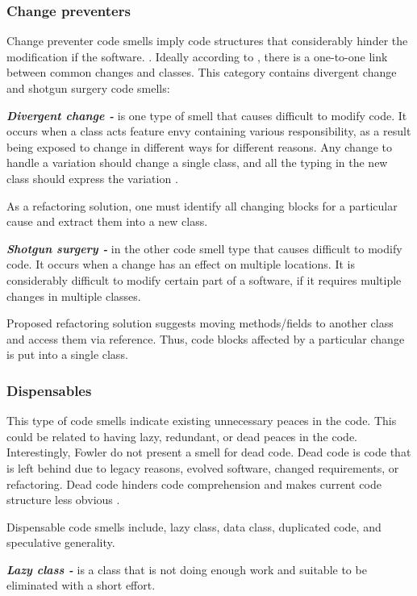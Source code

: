 \subsubsection*{Change preventers}
Change preventer code smells imply code structures that considerably hinder the modification if the software.  \cite{mantylaTaxonomy}. Ideally according to \cite{fowlerRefactor}, there is a one-to-one link between common changes and classes. This category contains divergent change and shotgun surgery code smells:

\textit{\textbf{Divergent change -}} is one type of smell that causes difficult to modify code. It occurs when a class acts feature envy containing various responsibility, as a result being exposed to change in different ways for different reasons. Any change to handle a variation should change a single class, and all the typing in the new class should express the variation \cite{fowlerRefactor}.

As a refactoring solution, one must identify all changing blocks for a particular cause and extract them into a new class. 
 
\textit{\textbf{Shotgun surgery -}} in the other code smell type that causes difficult to modify code. It occurs when a change has an effect on multiple locations. It is considerably difficult to modify certain part of a software, if it requires multiple changes in multiple classes.

Proposed refactoring solution suggests moving methods/fields to another class and access them via reference. Thus, code blocks affected by a particular change is put into a single class. 

\subsubsection*{Dispensables}
This type of code smells indicate existing unnecessary peaces in the code. This could be related to having lazy, redundant, or dead peaces in the code. Interestingly, Fowler \cite{fowlerRefactor} do not present a smell for dead code. Dead code is code that is left behind due to legacy reasons, evolved software, changed requirements, or refactoring. Dead code hinders code comprehension and makes current code structure less obvious \cite{mantylaTaxonomy}.

Dispensable code smells include, lazy class, data class, duplicated code, and speculative generality.

\textit{\textbf{Lazy class -}} is a class that is not doing enough work and suitable to be eliminated with a short effort. 

